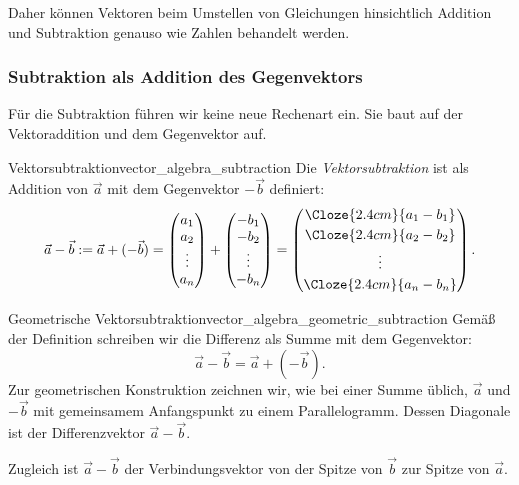 Daher können Vektoren beim Umstellen von Gleichungen hinsichtlich Addition
und Subtraktion genauso wie Zahlen behandelt werden.

\subsubsection{Subtraktion als Addition des Gegenvektors}
\label{subsubsec:vector_algebra_subtraction}

Für die Subtraktion führen wir keine neue Rechenart ein. Sie baut auf der
Vektoraddition und dem Gegenvektor auf.

\begin{DefinitionBox}{Vektorsubtraktion}{vector_algebra_subtraction}
  Die \emph{Vektorsubtraktion}  ist als
  Addition von $\vec a$ mit dem Gegenvektor $-\vec b$ definiert:
  \[
    \vec a-\vec b
    :=\vec a+(-\vec b)
    =\begin{pmatrix}a_1\\a_2\\\vdots\\a_n\end{pmatrix}
     +\begin{pmatrix}-b_1\\-b_2\\\vdots\\-b_n\end{pmatrix}
    =\begin{pmatrix}
      \Cloze{2.4cm}{a_1-b_1}\\[0.25em]
      \Cloze{2.4cm}{a_2-b_2}\\[0.25em]
      \vdots\\[0.25em]
      \Cloze{2.4cm}{a_n-b_n}
    \end{pmatrix}.
  \]
\end{DefinitionBox}

\begin{KeyPointBox}{Geometrische Vektorsubtraktion}{vector_algebra_geometric_subtraction}
  Gemäß der Definition schreiben wir die Differenz als Summe mit dem
  Gegenvektor:
  \[
    \vec a-\vec b=\vec a+(-\vec b).
  \]
  Zur geometrischen Konstruktion zeichnen wir, wie bei einer Summe üblich,
  $\vec a$ und $-\vec b$ mit gemeinsamem Anfangspunkt zu einem Parallelogramm.
  Dessen Diagonale ist der Differenzvektor $\vec a-\vec b$.
  \begin{center}
  \end{center}
  Zugleich ist $\vec a-\vec b$ der Verbindungsvektor von der Spitze von
  $\vec b$ zur Spitze von $\vec a$.
\end{KeyPointBox}

